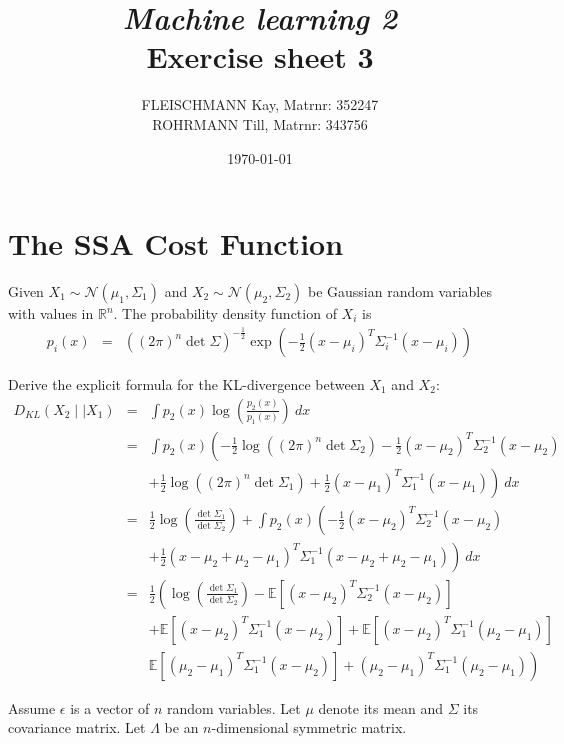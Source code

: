 \documentclass[a4paper, 12pt, titlepage]{article}
\title
{{\em Machine learning 2}\\
Exercise sheet 3}
\author{FLEISCHMANN Kay, Matrnr: 352247\\
	ROHRMANN Till, Matrnr: 343756}
\date{\today}
\begin{document}
\maketitle

\setcounter{section}{2}

\section{The SSA Cost Function}

Given $X_1 \sim \mathcal{N}(\mu_1,\Sigma_1)$ and $X_2 \sim \mathcal{N}(\mu_2,\Sigma_2)$ be Gaussian random variables with values in $\mathbb{R}^n$.
The probability density function of $X_i$ is
\begin{eqnarray}
	p_{i}(x) &=& \left ( (2\pi)^n \det \Sigma \right)^{-\frac{1}{2}} \exp\left ( -\frac{1}{2} (x-\mu_i)^T\Sigma_i^{-1}(x-\mu_i)\right)
\end{eqnarray}

Derive the explicit formula for the KL-divergence between $X_1$ and $X_2$:
\begin{eqnarray}
	D_{KL}(X_2 \mid\mid X_1) &=& \int p_2(x) \log\left( \frac{p_2(x)}{p_1(x)} \right)\ dx \\
	&=& \int p_2(x) \left( -\frac{1}{2}\log\left( (2\pi)^n \det \Sigma_2 \right) -\frac{1}{2}(x-\mu_2)^T\Sigma_2^{-1}(x-\mu_2)  \right. \nonumber \\
	&& \left. +\frac{1}{2}\log\left( (2\pi)^n \det \Sigma_1 \right) + \frac{1}{2}(x-\mu_1)^T\Sigma_1^{-1}(x-\mu_1) \right)\ dx \\
	&=& \frac{1}{2}\log\left( \frac{\det \Sigma_1}{\det \Sigma_2} \right) + \int p_2(x) \left( -\frac{1}{2}(x-\mu_2)^T\Sigma_2^{-1}(x-\mu_2) \right. \nonumber\\
	&& \left. +\frac{1}{2} (x-\mu_2 +\mu_2 -\mu_1)^T\Sigma^{-1}_1(x-\mu_2+\mu_2-\mu_1) \right)\ dx \\
	&=& \frac{1}{2}\left( \log\left( \frac{\det\Sigma_1}{\det\Sigma_2} \right) - \mathbb{E}\left[(x-\mu_2)^T\Sigma_2^{-1}(x-\mu_2) \right] \right. \nonumber \\
	&& \left. + \mathbb{E}\left[(x-\mu_2)^T\Sigma_1^{-1}(x-\mu_2) \right] + \mathbb{E}\left[ (x-\mu_2)^T\Sigma_1^{-1}(\mu_2-\mu_1) \right] \right. \nonumber \\
	&& \left. \mathbb{E}\left[(\mu_2-\mu_1)^T\Sigma_1^{-1}(x-\mu_2) \right] + (\mu_2-\mu_1)^T\Sigma_1^{-1}(\mu_2-\mu_1) \right) \label{eq:exp}
\end{eqnarray}

Assume $\epsilon$ is a vector of $n$ random variables. Let $\mu$ denote its mean and $\Sigma$ its covariance matrix. Let $\Lambda$ be an $n$-dimensional symmetric matrix.
\end{document}
